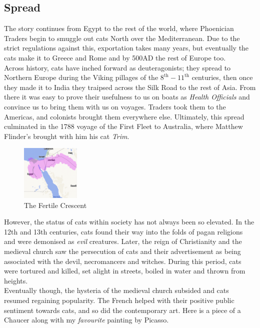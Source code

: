 \documentclass{article}
\begin{document}
\subsection*{Spread}

The story continues from Egypt to the rest of the world, where Phoenician Traders begin to smuggle out cats North over the Mediterranean. Due to the strict regulations against this, exportation takes many years, but eventually the cats make it to Greece and Rome and by 500AD the rest of Europe too.\\

Across history, cats have inched forward as deuteragonists; they spread to Northern Europe during the Viking pillages of the \(8^{\text{th}} - 11^{\text{th}}\) centuries, then once they made it to India they traipsed across the Silk Road to the rest of Asia. From there it was easy to prove their usefulness to us on boats as \emph{Health Officials} and convince us to bring them with us on voyages. Traders took them to the Americas, and colonists brought them everywhere else. Ultimately, this spread culminated in the 1788 voyage of the First Fleet to Australia, where Matthew Flinder's brought with him his cat \emph{Trim}.\\

\begin{figure}
    \includegraphics[width=0.25\textwidth]{img/crescent.png}
    \caption{The Fertile Crescent}
\end{figure}


However, the status of cats within society has not always been so elevated. In the 12th and 13th centuries, cats found their way into the folds of pagan religions and were demonised as \emph{evil} creatures. Later, the reign of Christianity and the medieval church saw the persecution of cats and their advertisement as being associated with the devil, necromancers and witches. During this period, cats were tortured and killed, set alight in streets, boiled in water and thrown from heights.\\

Eventually though, the hysteria of the medieval church subsided and cats resumed regaining popularity. The French helped with their positive public sentiment towards cats, and so did the contemporary art. Here is a piece of a Chaucer along with my \emph{favourite} painting by Picasso.\\\\
\end{document}
